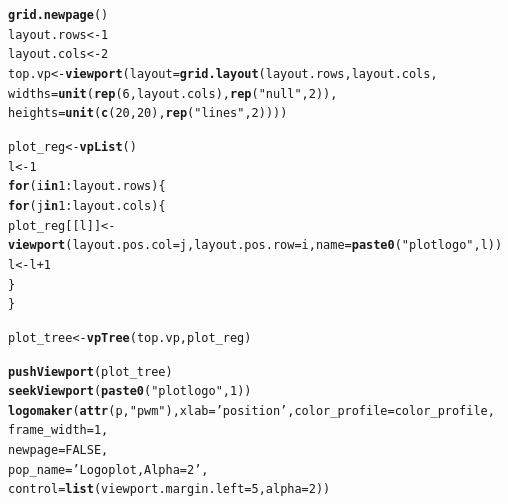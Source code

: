\documentclass[12pt]{article}\usepackage[]{graphicx}\usepackage[usenames,dvipsnames]{color}
\makeatletter
\newcommand{\hlnum}[1]{\textcolor[rgb]{0.686,0.059,0.569}{#1}}%
\newcommand{\hlstr}[1]{\textcolor[rgb]{0.192,0.494,0.8}{#1}}%
\newcommand{\hlopt}[1]{\textcolor[rgb]{0,0,0}{#1}}%
\newcommand{\hlstd}[1]{\textcolor[rgb]{0.345,0.345,0.345}{#1}}%
\newcommand{\hlkwa}[1]{\textcolor[rgb]{0.161,0.373,0.58}{\textbf{#1}}}%
\newcommand{\hlkwb}[1]{\textcolor[rgb]{0.69,0.353,0.396}{#1}}%
\newcommand{\hlkwc}[1]{\textcolor[rgb]{0.333,0.667,0.333}{#1}}%
\newcommand{\hlkwd}[1]{\textcolor[rgb]{0.737,0.353,0.396}{\textbf{#1}}}%
\newenvironment{kframe}{%
 \def\at@end@of@kframe{}%
 \ifinner\ifhmode%
  \def\at@end@of@kframe{\end{minipage}}%
  \begin{minipage}{\columnwidth}%
 \fi\fi%
 \def\FrameCommand##1{\hskip\@totalleftmargin \hskip-\fboxsep
 \colorbox{shadecolor}{##1}\hskip-\fboxsep
     \hskip-\linewidth \hskip-\@totalleftmargin \hskip\columnwidth}%
 \MakeFramed {\advance\hsize-\width
   \@totalleftmargin\z@ \linewidth\hsize
   \@setminipage}}%
 {\par\unskip\endMakeFramed%
 \at@end@of@kframe}
\newenvironment{knitrout}{}{} %
\makeatother
\begin{document}
\begin{knitrout}
\color{fgcolor}\begin{kframe}
\begin{alltt}
\hlkwd{grid.newpage}\hlstd{()}
\hlstd{layout.rows} \hlkwb{<-} \hlnum{1}
\hlstd{layout.cols} \hlkwb{<-} \hlnum{2}
\hlstd{top.vp} \hlkwb{<-} \hlkwd{viewport}\hlstd{(}\hlkwc{layout}\hlstd{=}\hlkwd{grid.layout}\hlstd{(layout.rows, layout.cols,}
                                      \hlkwc{widths}\hlstd{=}\hlkwd{unit}\hlstd{(}\hlkwd{rep}\hlstd{(}\hlnum{6}\hlstd{,layout.cols),} \hlkwd{rep}\hlstd{(}\hlstr{"null"}\hlstd{,} \hlnum{2}\hlstd{)),}
                                      \hlkwc{heights}\hlstd{=}\hlkwd{unit}\hlstd{(}\hlkwd{c}\hlstd{(}\hlnum{20}\hlstd{,}\hlnum{20}\hlstd{),} \hlkwd{rep}\hlstd{(}\hlstr{"lines"}\hlstd{,} \hlnum{2}\hlstd{))))}

\hlstd{plot_reg} \hlkwb{<-} \hlkwd{vpList}\hlstd{()}
\hlstd{l} \hlkwb{<-} \hlnum{1}
\hlkwa{for}\hlstd{(i} \hlkwa{in} \hlnum{1}\hlopt{:}\hlstd{layout.rows)\{}
  \hlkwa{for}\hlstd{(j} \hlkwa{in} \hlnum{1}\hlopt{:}\hlstd{layout.cols)\{}
    \hlstd{plot_reg[[l]]} \hlkwb{<-} \hlkwd{viewport}\hlstd{(}\hlkwc{layout.pos.col} \hlstd{= j,} \hlkwc{layout.pos.row} \hlstd{= i,} \hlkwc{name} \hlstd{=} \hlkwd{paste0}\hlstd{(}\hlstr{"plotlogo"}\hlstd{, l))}
    \hlstd{l} \hlkwb{<-} \hlstd{l}\hlopt{+}\hlnum{1}
  \hlstd{\}}
\hlstd{\}}


\hlstd{plot_tree} \hlkwb{<-} \hlkwd{vpTree}\hlstd{(top.vp, plot_reg)}

\hlkwd{pushViewport}\hlstd{(plot_tree)}
\hlkwd{seekViewport}\hlstd{(}\hlkwd{paste0}\hlstd{(}\hlstr{"plotlogo"}\hlstd{,} \hlnum{1}\hlstd{))}
\hlkwd{logomaker}\hlstd{(}\hlkwd{attr}\hlstd{(p,} \hlstr{"pwm"}\hlstd{),}\hlkwc{xlab} \hlstd{=} \hlstr{'position'}\hlstd{,}\hlkwc{color_profile} \hlstd{= color_profile,}
          \hlkwc{frame_width} \hlstd{=} \hlnum{1}\hlstd{,}
          \hlkwc{newpage} \hlstd{=} \hlnum{FALSE}\hlstd{,}
          \hlkwc{pop_name} \hlstd{=} \hlstr{'Logo plot, Alpha=2'}\hlstd{,}
          \hlkwc{control} \hlstd{=} \hlkwd{list}\hlstd{(}\hlkwc{viewport.margin.left} \hlstd{=} \hlnum{5}\hlstd{,}\hlkwc{alpha}\hlstd{=}\hlnum{2}\hlstd{))}



\end{alltt}
\end{kframe}
\end{knitrout}
\end{document}
